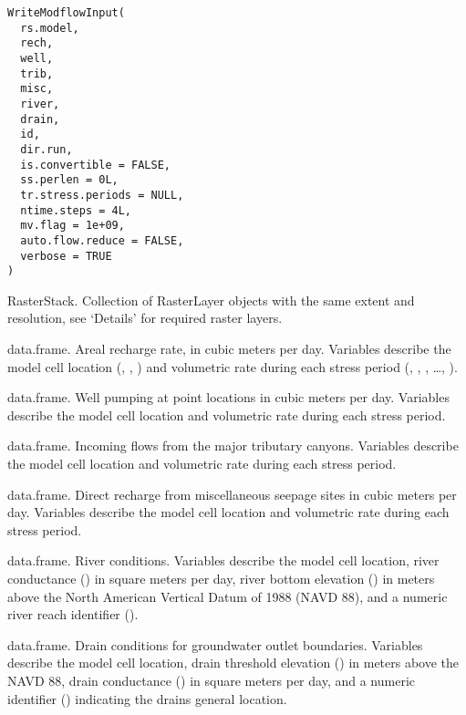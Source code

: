 \documentclass[a4paper]{book}
\begin{document}
%
\begin{Usage}
\begin{verbatim}
WriteModflowInput(
  rs.model,
  rech,
  well,
  trib,
  misc,
  river,
  drain,
  id,
  dir.run,
  is.convertible = FALSE,
  ss.perlen = 0L,
  tr.stress.periods = NULL,
  ntime.steps = 4L,
  mv.flag = 1e+09,
  auto.flow.reduce = FALSE,
  verbose = TRUE
)
\end{verbatim}
\end{Usage}
%
\begin{Arguments}
\begin{ldescription}
\item[\code{rs.model}] RasterStack.
Collection of RasterLayer objects with the same extent and resolution,
see `Details' for required raster layers.

\item[\code{rech}] data.frame.
Areal recharge rate, in cubic meters per day.
Variables describe the model cell location (, , ) and
volumetric rate during each stress period
(, , , \dots, ).

\item[\code{well}] data.frame.
Well pumping at point locations in cubic meters per day.
Variables describe the model cell location and volumetric rate during each stress period.

\item[\code{trib}] data.frame.
Incoming flows from the major tributary canyons.
Variables describe the model cell location and volumetric rate during each stress period.

\item[\code{misc}] data.frame.
Direct recharge from miscellaneous seepage sites in cubic meters per day.
Variables describe the model cell location and volumetric rate during each stress period.

\item[\code{river}] data.frame.
River conditions.
Variables describe the model cell location, river conductance
() in square meters per day, river bottom elevation () in
meters above the North American Vertical Datum of 1988 (NAVD 88), and
a numeric river reach identifier ().

\item[\code{drain}] data.frame.
Drain conditions for groundwater outlet boundaries.
Variables describe the model cell location, drain threshold elevation
() in meters above the NAVD 88, drain conductance () in
square meters per day, and a numeric identifier () indicating the
drains general location.


\end{ldescription}
\end{Arguments}
\end{document}

